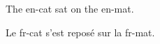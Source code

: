 \documentclass[english,french]{article}
\begin{document}
The \gls{en-cat} sat on the \gls{en-mat}.

Le \gls{fr-cat} s'est repos\'e sur la \gls{fr-mat}.

\printglossary[type=english]

\printglossary[type=french]
\end{document}

